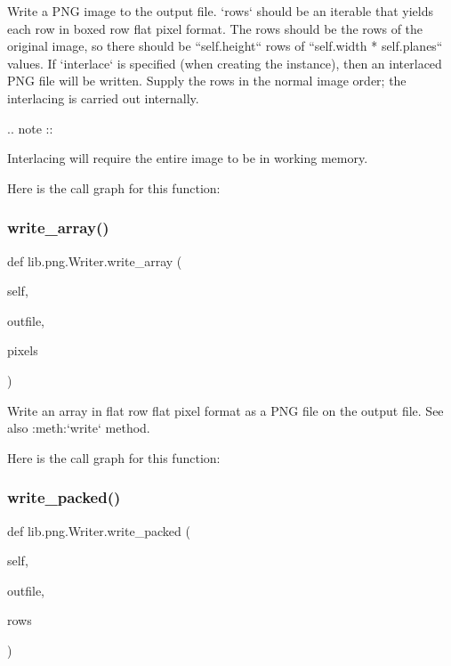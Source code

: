 \begin{DoxyVerb}Write a PNG image to the output file.  `rows` should be
an iterable that yields each row in boxed row flat pixel
format.  The rows should be the rows of the original image,
so there should be ``self.height`` rows of ``self.width *
self.planes`` values.  If `interlace` is specified (when
creating the instance), then an interlaced PNG file will
be written.  Supply the rows in the normal image order;
the interlacing is carried out internally.

.. note ::

  Interlacing will require the entire image to be in working
  memory.
\end{DoxyVerb}
 Here is the call graph for this function\+:
\mbox{\label{classlib_1_1png_1_1_writer_a9d00f4d4809f82d0b6d52152579aedff}} 
\subsubsection{\texorpdfstring{write\+\_\+array()}{write\_array()}}
{\footnotesize\ttfamily def lib.\+png.\+Writer.\+write\+\_\+array (\begin{DoxyParamCaption}\item[{}]{self,  }\item[{}]{outfile,  }\item[{}]{pixels }\end{DoxyParamCaption})}

\begin{DoxyVerb}Write an array in flat row flat pixel format as a PNG file on
the output file.  See also :meth:`write` method.
\end{DoxyVerb}
 Here is the call graph for this function\+:
\mbox{\label{classlib_1_1png_1_1_writer_a7b00c3f8eebb81a53ab89aa17150012d}} 
\subsubsection{\texorpdfstring{write\+\_\+packed()}{write\_packed()}}
{\footnotesize\ttfamily def lib.\+png.\+Writer.\+write\+\_\+packed (\begin{DoxyParamCaption}\item[{}]{self,  }\item[{}]{outfile,  }\item[{}]{rows }\end{DoxyParamCaption})}

